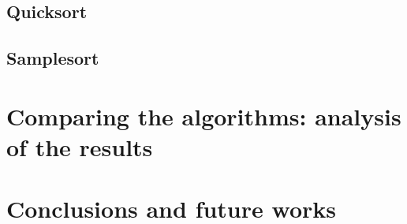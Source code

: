 \documentclass[a4paper,12pt,oneside,openright]{article}
\begin{document}
\subsection{Quicksort}

\subsection{Samplesort}



\section{Comparing the algorithms: analysis of the results}

\section{Conclusions and future works}


                                                                    

%



\pagebreak

\begin{thebibliography}{13}
\end{thebibliography}
\end{document}
